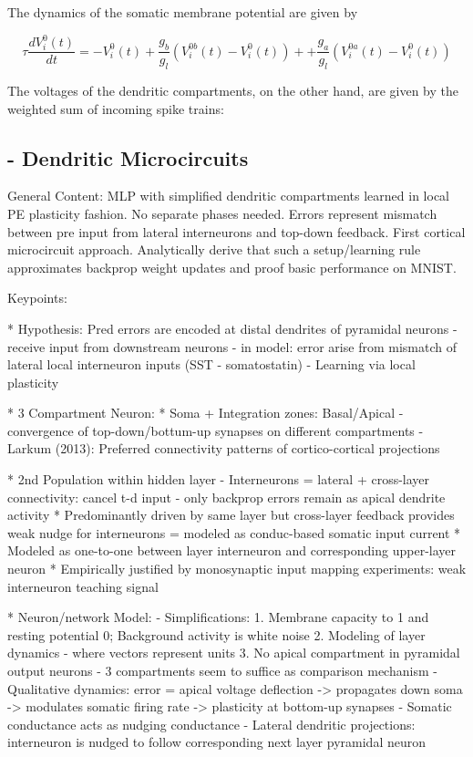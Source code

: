 \documentclass[colorinlistoftodos]{article}
\theoremstyle{definition}
\begin{document}
The dynamics of the somatic membrane potential are given by

$$\tau \frac{dV_i^0(t)}{dt} = -V_i^0(t) + \frac{g_b}{g_l}\left(V_i^{0b}(t) - V_i^0(t)\right) + + \frac{g_a}{g_l}\left(V_i^{0a}(t) - V_i^0(t)\right)$$

The voltages of the dendritic compartments, on the other hand, are given by the weighted sum of incoming spike trains:

\subsection*{\citet{sacramento2018} - Dendritic Microcircuits}

General Content: MLP with simplified dendritic compartments learned in local PE plasticity fashion. No separate phases needed. Errors represent mismatch between pre input from lateral interneurons and top-down feedback. First cortical microcircuit approach. Analytically derive that such a setup/learning rule approximates backprop weight updates and proof basic performance on MNIST.


Keypoints:

* Hypothesis: Pred errors are encoded at distal dendrites of pyramidal neurons - receive input from downstream neurons - in model: error arise from mismatch of lateral local interneuron inputs (SST - somatostatin) - Learning via local plasticity

* 3 Compartment Neuron:
    * Soma + Integration zones: Basal/Apical - convergence of top-down/bottum-up synapses on different compartments - Larkum (2013): Preferred connectivity patterns of cortico-cortical projections

* 2nd Population within hidden layer - Interneurons = lateral + cross-layer connectivity: cancel t-d input - only backprop errors remain as apical dendrite activity
    * Predominantly driven by same layer but cross-layer feedback provides weak nudge for interneurons = modeled as conduc-based somatic input current
    * Modeled as one-to-one between layer interneuron and corresponding upper-layer neuron
    * Empirically justified by monosynaptic input mapping experiments: weak interneuron teaching signal

* Neuron/network Model:
    - Simplifications:
        1. Membrane capacity to 1 and resting potential 0; Background activity is white noise
        2. Modeling of layer dynamics - where vectors represent units
        3. No apical compartment in pyramidal output neurons - 3 compartments seem to suffice as comparison mechanism
    - Qualitative dynamics: error = apical voltage deflection -> propagates down soma -> modulates somatic firing rate -> plasticity at bottom-up synapses
    - Somatic conductance acts as nudging conductance
    - Lateral dendritic projections: interneuron is nudged to follow corresponding next layer pyramidal neuron
\end{document}

